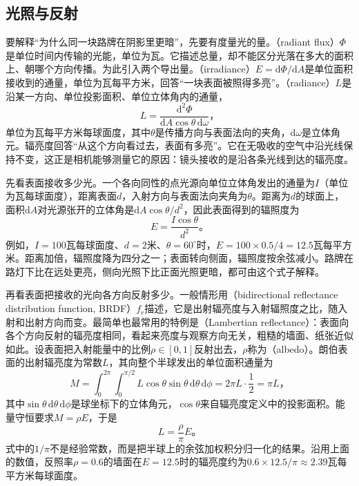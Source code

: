 \subsection{光照与反射}
\label{sec:vision-formation-radiometry}

要解释“为什么同一块路牌在阴影里更暗”，先要有度量光的量。（radiant flux）$\Phi$是单位时间内传输的光能，单位为瓦。它描述总量，却不能区分光落在多大的面积上、朝哪个方向传播。为此引入两个导出量。（irradiance）$E=\mathrm{d}\Phi/\mathrm{d}A$是单位面积接收到的通量，单位为瓦每平方米，回答“一块表面被照得多亮”。（radiance）$L$是沿某一方向、单位投影面积、单位立体角内的通量，
\[
  L=\frac{\mathrm{d}^2\Phi}{\mathrm{d}A\cos\theta\,\mathrm{d}\omega}\text{，}
\]
单位为瓦每平方米每球面度，其中$\theta$是传播方向与表面法向的夹角，$\mathrm{d}\omega$是立体角元。辐亮度回答“从这个方向看过去，表面有多亮”。它在无吸收的空气中沿光线保持不变，这正是相机能够测量它的原因：镜头接收的是沿各条光线到达的辐亮度。

先看表面接收多少光。一个各向同性的点光源向单位立体角发出的通量为$I$（单位为瓦每球面度），距离表面$d$，入射方向与表面法向夹角为$\theta$。距离为$d$的球面上，面积$\mathrm{d}A$对光源张开的立体角是$\mathrm{d}A\cos\theta/d^2$，因此表面得到的辐照度为
\begin{equation}
  E=\frac{I\cos\theta}{d^2}\text{。}
  \label{eq:vision-formation-point-irradiance}
\end{equation}
例如，$I=100$瓦每球面度、$d=2$米、$\theta=60^\circ$时，$E=100\times0.5/4=12.5$瓦每平方米。距离加倍，辐照度降为四分之一；表面转向侧面，辐照度按余弦减小。路牌在路灯下比在远处更亮，侧向光照下比正面光照更暗，都可由这个式子解释。

再看表面把接收的光向各方向反射多少。一般情形用（bidirectional reflectance distribution function, BRDF）$f_r$描述，它是出射辐亮度与入射辐照度之比，随入射和出射方向而变。最简单也最常用的特例是（Lambertian reflectance）：表面向各个方向反射的辐亮度相同，看起来亮度与观察方向无关，粗糙的墙面、纸张近似如此。设表面把入射能量中的比例$\rho\in[0,1]$反射出去，$\rho$称为（albedo）。朗伯表面的出射辐亮度为常数$L$，其向整个半球发出的单位面积通量为
\[
  M=\int_{0}^{2\pi}\!\!\int_{0}^{\pi/2}L\cos\theta\sin\theta\,\mathrm{d}\theta\,\mathrm{d}\phi
   =2\pi L\cdot\frac{1}{2}=\pi L\text{，}
\]
其中$\sin\theta\,\mathrm{d}\theta\,\mathrm{d}\phi$是球坐标下的立体角元，$\cos\theta$来自辐亮度定义中的投影面积。能量守恒要求$M=\rho E$，于是
\begin{equation}
  L=\frac{\rho}{\pi}E\text{。}
  \label{eq:vision-formation-lambert}
\end{equation}
式中的$1/\pi$不是经验常数，而是把半球上的余弦加权积分归一化的结果。沿用上面的数值，反照率$\rho=0.6$的墙面在$E=12.5$时的辐亮度约为$0.6\times12.5/\pi\approx2.39$瓦每平方米每球面度。

